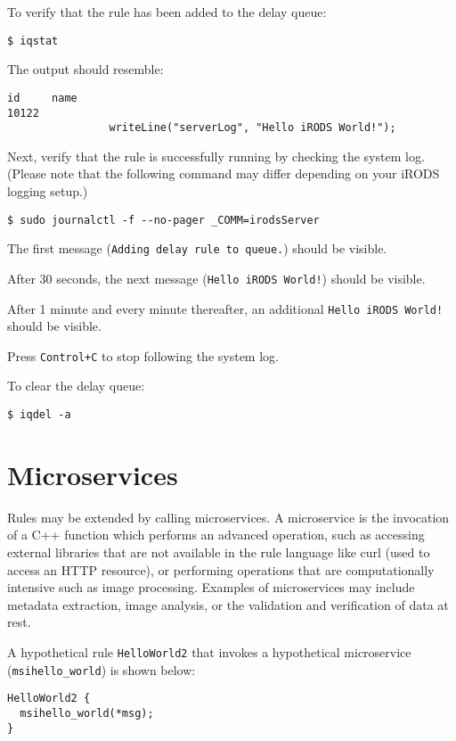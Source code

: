 \documentclass[10pt,oneside]{memoir}
\begin{document}
To verify that the rule has been added to the delay queue:

\begin{lstlisting}
$ iqstat
\end{lstlisting}

The output should resemble:
\begin{lstlisting}
id     name
10122  
                writeLine("serverLog", "Hello iRODS World!");
\end{lstlisting}

Next, verify that the rule is successfully running by checking the system log. (Please note that the following command may differ depending on your iRODS logging setup.)

\begin{lstlisting}
$ sudo journalctl -f --no-pager _COMM=irodsServer
\end{lstlisting}

The first message (\texttt{Adding delay rule to queue.}) should be visible.

After 30 seconds, the next message (\texttt{Hello iRODS World!}) should be visible.

After 1 minute and every minute thereafter, an additional \texttt{Hello iRODS World!} should be visible.

Press \texttt{Control+C} to stop following the system log.

To clear the delay queue:

\begin{lstlisting}
$ iqdel -a
\end{lstlisting}

\section{Microservices}

Rules may be extended by calling microservices. A microservice is the invocation of a C++ function which performs an advanced operation, such as accessing external libraries that are not available in the rule language like curl (used to access an HTTP resource), or performing operations that are computationally intensive such as image processing. Examples of microservices may include metadata extraction, image analysis, or the validation and verification of data at rest.

A hypothetical rule \texttt{HelloWorld2} that invokes a hypothetical microservice (\texttt{msihello\_world}) is shown below:

\begin{lstlisting}
HelloWorld2 {
  msihello_world(*msg);
}
\end{lstlisting}
\end{document}
